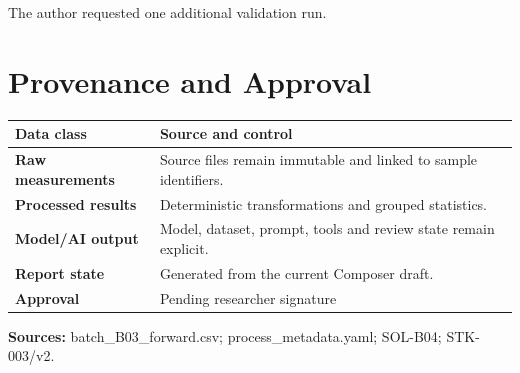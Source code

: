 \documentclass[10pt,a4paper]{article}
\begin{document}
The author requested one additional validation run.

\section{Provenance and Approval}

\begin{tabularx}{\linewidth}{@{}>{\bfseries}lX@{}}\toprule Data class & Source and control \\ \midrule Raw measurements & Source files remain immutable and linked to sample identifiers.\\ Processed results & Deterministic transformations and grouped statistics.\\ Model/AI output & Model, dataset, prompt, tools and review state remain explicit.\\ Report state & Generated from the current Composer draft.\\ Approval & Pending researcher signature\\ \bottomrule\end{tabularx}
\vspace{6mm}
\textbf{Sources:} batch\_B03\_forward.csv; process\_metadata.yaml; SOL-B04; STK-003/v2.
\end{document}
